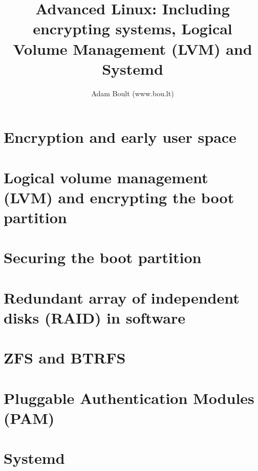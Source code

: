 \documentclass[oneside]{book}
\begin{document}
\author{Adam Boult (www.bou.lt)}
\title{Advanced Linux: Including encrypting systems, Logical Volume Management (LVM) and Systemd}
\maketitle

\setcounter{tocdepth}{0}
\tableofcontents



\part{Encryption and early user space}




\part{Logical volume management (LVM) and encrypting the boot partition}


\part{Securing the boot partition}



\part{Redundant array of independent disks (RAID) in software}


\part{ZFS and BTRFS}



\part{Pluggable Authentication Modules (PAM)}


\part{Systemd}

\end{document}
